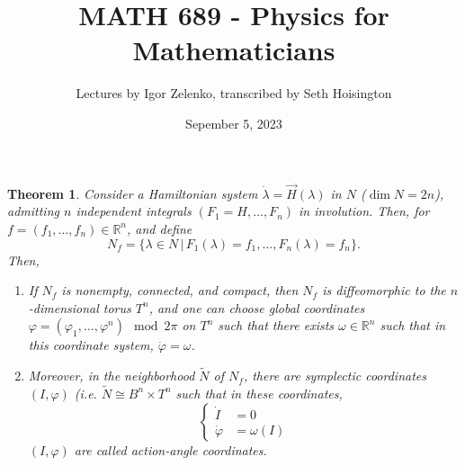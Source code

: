 \documentclass{article}
\title{MATH 689 - Physics for Mathematicians}
\author{Lectures by Igor Zelenko, transcribed by Seth Hoisington}
\date{Sepember 5, 2023}
\newcommand{\R}{\mathbb R}
\newcommand{\vhi}{\varphi}
\newcommand{\w}{\omega}
\newtheorem{thm}{Theorem}
\begin{document}
\maketitle

\begin{thm}
    Consider a Hamiltonian system $\dot\lambda = \vec H(\lambda)$ in $N$ ($\dim N = 2n$), admitting $n$ independent integrals $(F_1 = H,\dots,F_n)$ in involution. Then, for $f = (f_1,\dots,f_n)\in \R^n$, and define
    \[N_f = \{\lambda\in N\,|\, F_1(\lambda) = f_1,\dots, F_n(\lambda) = f_n\}.\]
    Then,
    \begin{enumerate}
        \item If $N_f$ is nonempty, connected, and compact, then $N_f$ is diffeomorphic to the $n$-dimensional torus $T^n$, and one can choose global coordinates $\vhi = (\vhi_1,\dots, \vhi^n)\mod 2\pi$ on $T^n$ such that there exists $\w\in\R^n$ such that in this coordinate system, $\dot\vhi = \w$.
        \item Moreover, in the neighborhood $\tilde N$ of $N_f$, there are symplectic coordinates $(I,\vhi)$ (i.e. $\tilde N \cong B^n\times T^n$ such that in these coordinates, 
        \[\left\{\begin{aligned}
            \dot I &= 0\\
            \dot\vhi &= \w(I)
        \end{aligned}\right.\]
        $(I,\vhi)$ are called action-angle coordinates.
    \end{enumerate}
\end{thm}
\end{document}
